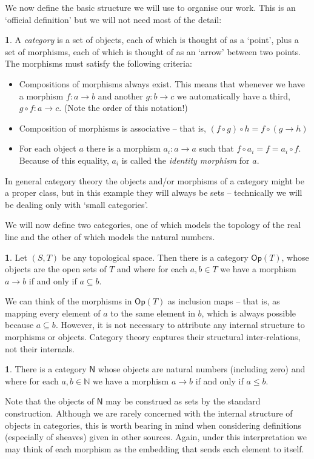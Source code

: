 \documentclass[oneside,english]{article}
\theoremstyle{plain}
\theoremstyle{definition}
\newtheorem{defn}[thm]{\protect\definitionname}
\theoremstyle{definition}
\providecommand{\definitionname}{Definition}
\begin{document}
We now define the basic structure we will use to organise our work. This is an `official definition' but we will not need most of the detail:
\begin{defn}
	A \emph{category} is a set of objects, each of which is thought of as a `point', plus a set of morphisms, each of which is thought of as an `arrow' between two points. The morphisms must satisfy the following criteria:
	\begin{itemize}
		\item Compositions of morphisms always exist. This means that whenever we have a morphism $f:a\to b$ and another $g:b\to c$ we automatically have a third, $g\circ f:a\to c$. (Note the order of this notation!)
		\item Composition of morphisms is associative -- that is, $(f\circ g)\circ h = f\circ (g\to h)$
		\item For each object $a$ there is a morphism $a_i:a\to a$ such that $f\circ a_i = f = a_i\circ f$. Because of this equality, $a_i$ is called the \emph{identity morphism} for $a$.
	\end{itemize}
\end{defn}
In general category theory the objects and/or morphisms of a category might be a proper class, but in this example they will always be sets -- technically we will be dealing only with `small categories'.

We will now define two categories, one of which models the topology of the real line and the other of which models the natural numbers.
\begin{defn}
	Let $(S, T)$ be any topological space. Then there is a category $\boldsymbol{\mathsf{Op}}(T)$, whose objects are the open sets of $T$ and where for each $a, b\in T$ we have a morphism $a\to b$ if and only if $a\subseteq b$.
\end{defn}
We can think of the morphisms in $\boldsymbol{\mathsf{Op}}(T)$ as inclusion maps -- that is, as mapping every element of $a$ to the same element in $b$, which is always possible because $a\subseteq b$. However, it is not necessary to attribute any internal structure to morphisms or objects. Category theory captures their structural inter-relations, not their internals.
\begin{defn}
	There is a category $\boldsymbol{\mathsf{N}}$ whose objects are natural numbers (including zero) and where for each $a, b\in \mathbb{N}$ we have a morphism $a\to b$ if and only if $a\le b$.
\end{defn}
Note that the objects of $\boldsymbol{\mathsf{N}}$ may be construed as sets by the standard construction. Although we are rarely concerned with the internal structure of objects in categories, this is worth bearing in mind when considering definitions (especially of sheaves) given in other sources. Again, under this interpretation we may think of each morphism as the embedding that sends each element to itself.
\end{document}
